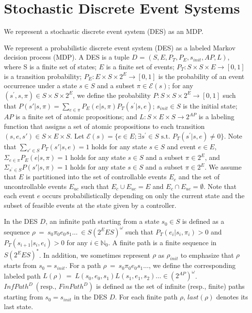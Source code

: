 \section{Stochastic Discrete Event Systems}
We represent a stochastic discrete event system (DES) as an MDP.

\begin{definition}
We represent a probabilistic discrete event system (DES) as a labeled Markov decision process (MDP). A DES is a tuple $D$ = $(S, E, P_T, P_E, s_{init}, AP, L)$, where S is a finite set of states; $E$ is a finite set of events; $P_T:S \times S \times E \rightarrow [0,1]$ is a transition probability; $P_E : E \times S \times 2^E \rightarrow [0,1]$ is the probability of an event occurrence under a state $s \in S$ and a subset $\pi \in \mathcal{E}(s)$; for any $(s^{\prime}, s, \pi) \in S \times S \times 2^E$, we define the probability $P : S \times S \times 2^{E} \rightarrow [0,1]$ such that $P(s'|s,\pi) = \sum_{e \in \pi}P_E(e|s,\pi) P_T(s^{\prime}|s,e)$; $s_{init} \in S$ is the initial state; $AP$ is a finite set of atomic propositions; and $L : S \times E \times S \rightarrow 2^{AP}$ is a labeling function that assigns a set of atomic propositions to each transition $(s, e, s') \in S \times E \times S$.
Let $\mathcal{E}(s) = \{ e \in E ; \exists s^{\prime} \in S \text{ s.t. } P_T (s^{\prime} | s, e) \neq 0 \}$.
Note that $\sum_{s' \in S} P_T(s'|s,e) = 1$ holds for any state $s \in S$ and event $e \in E$, $\Sigma_{e \in \pi} P_E(e|s,\pi) = 1$ holds for any state $s \in S$ and a subset $\pi \in 2^E$, and $\Sigma_{s^{\prime} \in S} P(s'|s,\pi) = 1$ holds for any state $s \in S$ and a subset $\pi \in 2^E$.
We assume that $E$ is partitioned into the set of controllable events $E_c$ and the set of uncontrollable events $E_{uc}$ such that $E_c \cup E_{uc} = E$ and $E_c \cap E_{uc} = \emptyset$. Note that each event $e$ occurs probabilistically depending on only the current state and the subset of feasible events at the state given by a controller.

In the DES $D$, an infinite path starting from a state $s_0 \in S$ is defined as a sequence $\rho\ =\ s_0\pi_0e_0s_1 \ldots\ \in S (2^E E S)^{\omega}$ such that $P_T(e_{i}|s_i, \pi_i) > 0$ and $P_T(s_{i+1}|s_i, e_i) > 0$ for any $ i \in \mathbb{N}_0$. A finite path is a finite sequence in $S (2^E E S)^*$. In addition, we sometimes represent $\rho$ as $\rho_{init}$ to emphasize that $\rho$ starts from $s_0 = s_{init}$.
For a path $\rho\ =\ s_0\pi_0e_0s_1 \ldots$, we define the corresponding labeled path $L(\rho)\ =\ L(s_0,e_0,s_1)L(s_1,e_1,s_2) \ldots \in (2^{AP})^{\omega}$.
 $InfPath^{D}\ ( \text{resp., }FinPath^{D})$ is defined as the set of infinite (resp., finite) paths starting from $s_0=s_{init}$ in the DES $D$. For each finite path $\rho$, $last(\rho)$ denotes its last state.
\end{definition}

